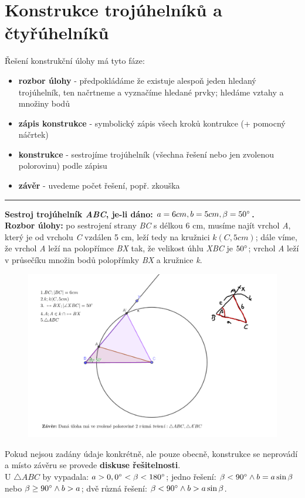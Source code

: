 \documentclass[12pt, a4paper]{article}
\begin{document}
\pagebreak

\section{Konstrukce trojúhelníků a čtyřúhelníků}
Řešení konstrukční úlohy má tyto fáze:\\
\begin{itemize}
\item \textbf{rozbor úlohy} - předpokládáme že existuje alespoň jeden hledaný trojúhelník, ten načrtneme a vyznačíme hledané prvky; hledáme vztahy a množiny bodů
\item \textbf{zápis konstrukce} - symbolický zápis všech kroků kontrukce (+ pomocný náčrtek)
\item \textbf{konstrukce} - sestrojíme trojúhelník (všechna řešení nebo jen zvolenou polorovinu) podle zápisu
\item \textbf{závěr} - uvedeme počet řešení, popř. zkouška
\end{itemize}

\rule{13.5cm}{0.4pt}

\textbf{\color{green} Sestroj trojúhelník \textit{ABC}, je-li dáno: $a=6cm, b = 5cm, \beta = 50 \degree $.} \color{black}\\
\textbf{Rozbor úlohy:} po sestrojení strany \textit{BC} s délkou 6 cm, musíme najít vrchol \textit{A}, který je od vrcholu \textit{C} vzdálen 5 cm, leží tedy na kružnici $k(C, 5cm)$;
dále víme, že vrchol \textit{A} leží na polopřímce \textit{BX} tak, že velikost úhlu \textit{XBC} je $50 \degree$; vrchol \textit{A} leží v průsečíku množin bodů polopřímky \textit{BX} 
a kružnice \textit{k}. 

\begin{figure}[H]
\includegraphics[scale=0.5]{konstrukce1}
\end{figure}
Pokud nejsou zadány údaje konkrétně, ale pouze obecně, konstrukce se neprovádí a místo závěru se provede \textbf{diskuse řešitelnosti}.\\
U $\triangle ABC$ by vypadala: $a > 0, 0 \degree < \beta < 180\degree$; jedno řešení: $\beta < 90\degree \land b = a \sin \beta$ nebo $\beta \geq 90 \degree \land b > a$;
dvě různá řešení: $\beta < 90\degree \land b > a \sin \beta$.
\end{document}
